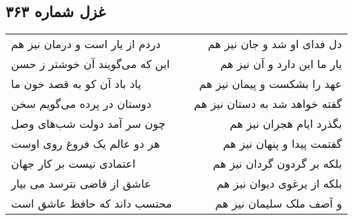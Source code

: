 \begin{center}
\section*{غزل شماره ۳۶۳}
\label{sec:sh363}
\begin{longtable}{l p{0.5cm} r}
دردم از یار است و درمان نیز هم
&&
دل فدای او شد و جان نیز هم
\\
این که می‌گویند آن خوشتر ز حسن
&&
یار ما این دارد و آن نیز هم
\\
یاد باد آن کو به قصد خون ما
&&
عهد را بشکست و پیمان نیز هم
\\
دوستان در پرده می‌گویم سخن
&&
گفته خواهد شد به دستان نیز هم
\\
چون سر آمد دولت شب‌های وصل
&&
بگذرد ایام هجران نیز هم
\\
هر دو عالم یک فروغ روی اوست
&&
گفتمت پیدا و پنهان نیز هم
\\
اعتمادی نیست بر کار جهان
&&
بلکه بر گردون گردان نیز هم
\\
عاشق از قاضی نترسد می بیار
&&
بلکه از یرغوی دیوان نیز هم
\\
محتسب داند که حافظ عاشق است
&&
و آصف ملک سلیمان نیز هم
\\
\end{longtable}
\end{center}
